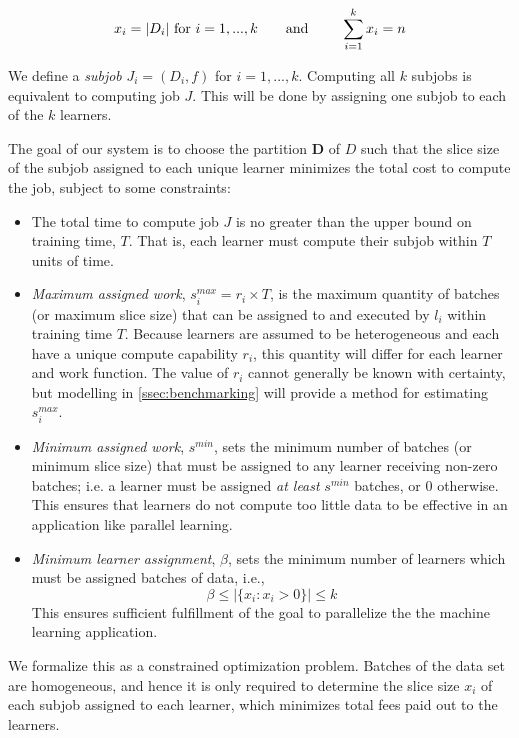 \documentclass[../mthe-493-final-project.tex]{subfiles}
\begin{document}
    \[x_i = \vert D_i \vert \textrm{ for } i = 1,...,k \textrm{\qquad and \qquad} \sum_{i=1}^k x_i = n\]
    
    We define a \textit{subjob} $J_i = (D_i,f)$ for $i = 1,...,k$. Computing all $k$ subjobs is equivalent to computing job $J$. This will be done by assigning one subjob to each of the $k$ learners.
    
    The goal of our system is to choose the partition $\boldsymbol{D}$ of $D$ such that the slice size of the subjob assigned to each unique learner minimizes the total cost to compute the job, subject to some constraints:

    \begin{itemize}
        \item The total time to compute job $J$ is no greater than the upper bound on training time, $T$. That is, each learner must compute their subjob within $T$ units of time.
        \item \textit{Maximum assigned work}, $s^{max}_i = r_i \times T$, is the maximum quantity of batches (or maximum slice size) that can be assigned to and executed by $l_i$ within training time $T$. Because learners are assumed to be heterogeneous and each have a unique compute capability $r_i$, this quantity will differ for each learner and work function. The value of $r_i$ cannot generally be known with certainty, but modelling in \autoref{ssec:benchmarking} will provide a method for estimating $s_i^{max}$.
        \item \textit{Minimum assigned work}, $s^{min}$, sets the minimum number of batches (or minimum slice size) that must be assigned to any learner receiving non-zero batches; i.e. a learner must be assigned \textit{at least} $s^{min}$ batches, or 0 otherwise. This ensures that learners do not compute too little data to be effective in an application like parallel learning.
        \item \textit{Minimum learner assignment}, $\beta$, sets the minimum number of learners which must be assigned batches of data, i.e.,
              \[\beta \leq \vert \{x_i : x_i > 0\} \vert \leq k\]
        This ensures sufficient fulfillment of the goal to parallelize the the machine learning application.
    \end{itemize}

    We formalize this as a constrained optimization problem. Batches of the data set are homogeneous, and hence it is only required to determine the slice size $x_i$ of each subjob assigned to each learner, which minimizes total fees paid out to the learners.
    
\end{document}
